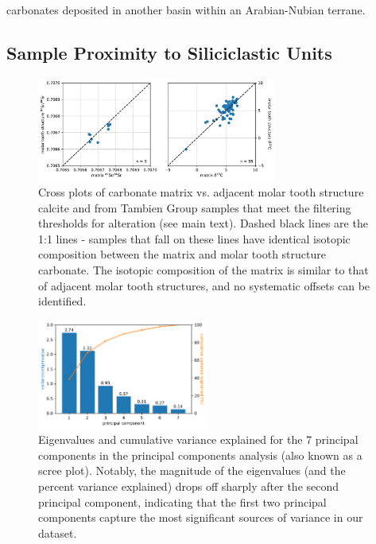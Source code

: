 carbonates deposited in another basin within an Arabian-Nubian terrane.

\clearpage

\subsection{Sample Proximity to Siliciclastic Units}

\begin{figure}[h!]
\begin{center}
	\includegraphics[width=0.7\textwidth]{figures/Tambien/MTS-MTX-comparison.pdf}
	\caption[Geochemistry of carbonate matrix vs. adjacent molar tooth structure calcite.]{Cross plots of carbonate matrix vs. adjacent molar tooth structure calcite \SrSr and \dC from Tambien Group samples that meet the filtering thresholds for alteration (see main text). Dashed black lines are the 1:1 lines - samples that fall on these lines have identical isotopic composition between the matrix and molar tooth structure carbonate. The isotopic composition of the matrix is similar to that of adjacent molar tooth structures, and no systematic offsets can be identified.}
	\label{fig:MTS-MTX-comparison}
\end{center}
\end{figure}

\begin{figure}[h!]
\begin{center}
	\includegraphics[width=0.5\textwidth]{figures/Tambien/siliciclastic-filtering-components.pdf}
	\caption[Eigenvalues and cumulative variance explained for the 7 principal components in the principal components analysis.]{Eigenvalues and cumulative variance explained for the 7 principal components in the principal components analysis (also known as a scree plot). Notably, the magnitude of the eigenvalues (and the percent variance explained) drops off sharply after the second principal component, indicating that the first two principal components capture the most significant sources of variance in our dataset.}
	\label{fig:siliciclastic-filtering-components}
\end{center}
\end{figure}

